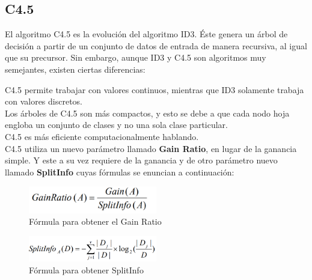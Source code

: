 \subsection{C4.5} \label{c4.5}
El algoritmo C4.5 es la evolución del algoritmo ID3. Éste genera un árbol de decisión a partir de un conjunto de datos de entrada de manera recursiva, al igual que su precursor. Sin embargo, aunque ID3 y C4.5 son algoritmos muy semejantes, existen ciertas diferencias:\\

\begin{UClist}
	\UCli C4.5 permite trabajar con valores continuos, mientras que ID3 solamente trabaja con valores discretos.\\
	\UCli Los árboles de C4.5 son más compactos, y esto se debe a que cada nodo hoja engloba un conjunto de clases y no una sola clase particular.\\
	\UCli C4.5 es más eficiente computacionalmente hablando.\\
	\UCli C4.5 utiliza un nuevo parámetro llamado \textbf{Gain Ratio}, en lugar de la ganancia simple. Y este a su vez requiere de la ganancia y de otro parámetro nuevo llamado \textbf{SplitInfo} cuyas fórmulas se enuncian a continuación:
	
	\begin{figure}[H]
		\hypertarget{fig:formula-gainratio}{\hspace{1pt}}
		\begin{center}
			\includegraphics[width=0.5\textwidth]{capitulo2/images/formula-gainratio.png}
			\caption{Fórmula para obtener el Gain Ratio}
			\label{fig:formula-gainratio}
		\end{center}
	\end{figure}

	\begin{figure}[H]
		\hypertarget{fig:formula-splitinfo}{\hspace{1pt}}
		\begin{center}
			\includegraphics[width=0.5\textwidth]{capitulo2/images/formula-splitinfo.png}
			\caption{Fórmula para obtener SplitInfo}
			\label{fig:formula-splitinfo}
		\end{center}
	\end{figure}

\end{UClist}

